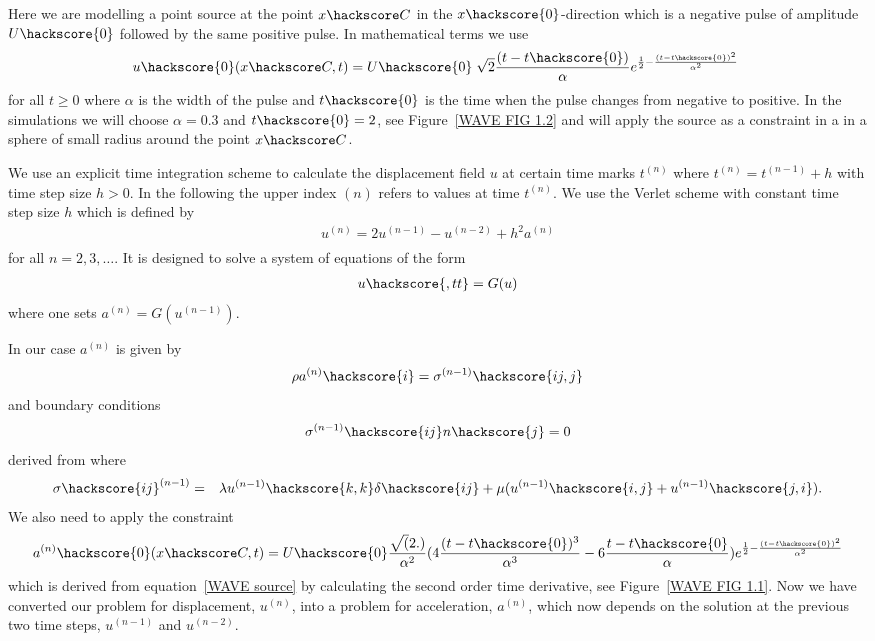 Here we are modelling a point source at the point $x\hackscore C$ in the $x\hackscore{0}$-direction
which is a negative pulse of amplitude $U\hackscore{0}$ followed by the same 
positive pulse. In mathematical terms we use
\begin{eqnarray} \label{WAVE source}
u\hackscore{0}(x\hackscore C,t)= U\hackscore{0} \; \sqrt{2}  \frac{(t-t\hackscore{0})}{\alpha} e^{\frac{1}{2}-\frac{(t-t\hackscore{0})^2}{\alpha^2}} \ 
\end{eqnarray}
for all $t\ge0$ where $\alpha$ is the width of the pulse and $t\hackscore{0}$ is the time when
the pulse changes from negative to positive. In the simulations we will choose $\alpha=0.3$ and $t\hackscore{0}=2$, see Figure~\ref{WAVE FIG 1.2}
and will apply the source as a constraint in a in a sphere of small radius around the point
$x\hackscore C$.  

 We use an explicit time integration scheme to calculate the displacement field $u$ at 
certain time marks $t^{(n)}$ where $t^{(n)}=t^{(n-1)}+h$ with time step size $h>0$. In the following the upper index ${(n)}$ refers to values at time $t^{(n)}$. We use the Verlet scheme  with constant time step size $h$
which is defined by
\begin{eqnarray} \label{WAVE dyn 2}
u^{(n)}=2u^{(n-1)}-u^{(n-2)} + h^2 a^{(n)} \\
\end{eqnarray}
for all $n=2,3,\ldots$. It is designed to solve a system of equations of the form
\begin{eqnarray} \label{WAVE dyn 2b} 
u\hackscore{,tt}=G(u)
\end{eqnarray}
where one sets $a^{(n)}=G(u^{(n-1)})$.

In our case $a^{(n)}$ is given by
\begin{eqnarray}\label{WAVE dyn 3}
\rho a^{(n)}\hackscore{i}=\sigma^{(n-1)}\hackscore{ij,j}
\end{eqnarray}
and boundary conditions
\begin{eqnarray} \label{WAVE natural at n}
\sigma^{(n-1)}\hackscore{ij}n\hackscore{j}=0
\end{eqnarray}
derived from  where 
\begin{eqnarray} \label{WAVE dyn 3a}
\sigma\hackscore{ij}^{(n-1)} & = & \lambda u^{(n-1)}\hackscore{k,k} \delta\hackscore{ij} + \mu ( u^{(n-1)}\hackscore{i,j} + u^{(n-1)}\hackscore{j,i}).
\end{eqnarray}
We also need to apply the constraint 
\begin{eqnarray} \label{WAVE dyn 3aa}
a^{(n)}\hackscore{0}(x\hackscore C,t)= U\hackscore{0} 
\frac{\sqrt(2.)}{\alpha^2} (4\frac{(t-t\hackscore{0})^3}{\alpha^3}-6\frac{t-t\hackscore{0}}{\alpha})e^{\frac{1}{2}-\frac{(t-t\hackscore{0})^2}{\alpha^2}}
\end{eqnarray}
which is derived from equation~\ref{WAVE source} by calculating the second order time derivative,
see Figure~\ref{WAVE FIG 1.1}. Now we have converted our problem for displacement, $u^{(n)}$, into a problem for 
acceleration, $a^{(n)}$, which now depends 
on the solution at the previous two time steps, $u^{(n-1)}$  and $u^{(n-2)}$.

